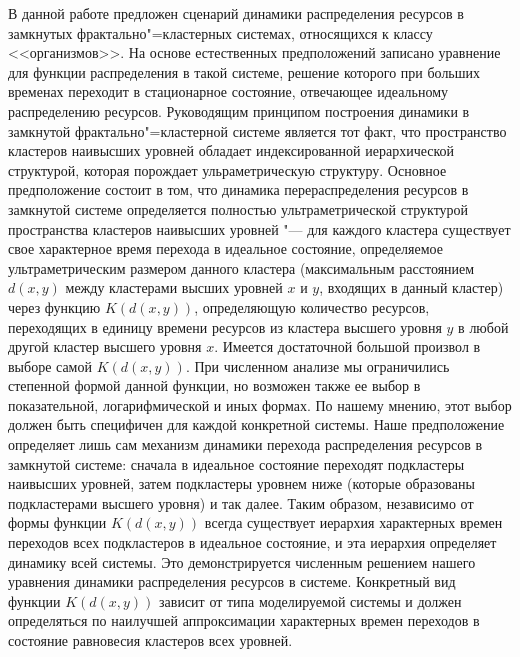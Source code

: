  В данной работе предложен сценарий
динамики распределения ресурсов в замкнутых фрактально"=кластерных
системах,  относящихся к классу <<организмов>>. На основе
естественных предположений записано уравнение для функции
распределения в такой системе, решение которого при больших
временах переходит в стационарное состояние, отвечающее идеальному
распределению ресурсов. Руководящим принципом построения динамики
в замкнутой фрактально"=кластерной системе является тот факт, что
пространство кластеров наивысших уровней обладает индексированной
иерархической структурой, которая порождает ульраметрическую
структуру. Основное  предположение состоит в том, что динамика перераспределения ресурсов в замкнутой системе
определяется полностью ультраметрической структурой пространства
кластеров наивысших уровней "--- для каждого кластера существует
свое характерное время перехода в идеальное состояние,
определяемое ультраметрическим размером данного кластера
(максимальным расстоянием $d(x,y)$ между кластерами высших уровней
$x$ и $y$, входящих в данный кластер) через функцию $K(d(x,y))$,
определяющую количество ресурсов, переходящих в единицу времени
ресурсов из кластера высшего уровня $y$ в любой другой кластер
высшего уровня $x$. Имеется достаточной большой произвол в выборе
самой $K(d(x,y))$. При численном анализе мы ограничились степенной
формой данной функции, но возможен также ее выбор в показательной,
логарифмической и иных формах. По нашему мнению, этот выбор должен
быть специфичен для каждой конкретной системы. Наше предположение
определяет лишь сам механизм динамики перехода распределения
ресурсов в замкнутой системе: сначала в идеальное состояние
переходят подкластеры наивысших уровней, затем подкластеры уровнем
ниже (которые образованы подкластерами высшего уровня) и так
далее. Таким образом, независимо от формы функции $K(d(x,y))$
всегда существует иерархия характерных времен переходов всех
подкластеров в идеальное состояние, и эта иерархия определяет
динамику всей системы. Это демонстрируется численным решением
нашего уравнения динамики распределения ресурсов в системе.
Конкретный вид функции $K(d(x,y))$ зависит от типа моделируемой
системы и должен определяться по наилучшей аппроксимации
характерных времен переходов в состояние равновесия кластеров всех
уровней.



